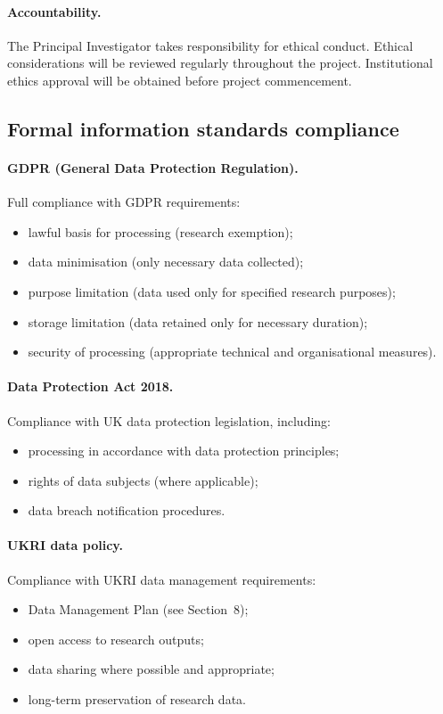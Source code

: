 \paragraph{Accountability.}
The Principal Investigator takes responsibility for ethical conduct. Ethical considerations will be reviewed regularly throughout the project. Institutional ethics approval will be obtained before project commencement.

\subsection{Formal information standards compliance}

\paragraph{GDPR (General Data Protection Regulation).}
Full compliance with GDPR requirements:
\begin{itemize}
  \item lawful basis for processing (research exemption);
  \item data minimisation (only necessary data collected);
  \item purpose limitation (data used only for specified research purposes);
  \item storage limitation (data retained only for necessary duration);
  \item security of processing (appropriate technical and organisational measures).
\end{itemize}

\paragraph{Data Protection Act 2018.}
Compliance with UK data protection legislation, including:
\begin{itemize}
  \item processing in accordance with data protection principles;
  \item rights of data subjects (where applicable);
  \item data breach notification procedures.
\end{itemize}

\paragraph{UKRI data policy.}
Compliance with UKRI data management requirements:
\begin{itemize}
  \item Data Management Plan (see Section~8);
  \item open access to research outputs;
  \item data sharing where possible and appropriate;
  \item long-term preservation of research data.
\end{itemize}

